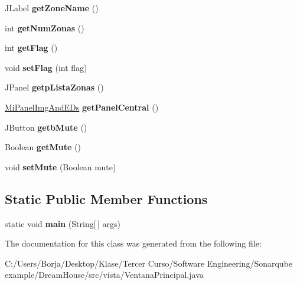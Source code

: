 \begin{DoxyCompactItemize}
\item 
\mbox{\label{classvista_1_1_ventana_principal_a1534a5187e8ce83f76c44abc02cb2236}} 
J\+Label {\bfseries get\+Zone\+Name} ()
\item 
\mbox{\label{classvista_1_1_ventana_principal_a7303665d4193ebf7c4693846114fb96d}} 
int {\bfseries get\+Num\+Zonas} ()
\item 
\mbox{\label{classvista_1_1_ventana_principal_a740a2cfb769129790ed6026fba51988b}} 
int {\bfseries get\+Flag} ()
\item 
\mbox{\label{classvista_1_1_ventana_principal_a355d4483232fb23eb4b2e1c27c7086a9}} 
void {\bfseries set\+Flag} (int flag)
\item 
\mbox{\label{classvista_1_1_ventana_principal_a95bbd92b1f1d270c58f62c6004efa0f3}} 
J\+Panel {\bfseries getp\+Lista\+Zonas} ()
\item 
\mbox{\label{classvista_1_1_ventana_principal_a34c5b655d700623d5a936f252211f80e}} 
\mbox{\hyperlink{classvista_1_1_mi_panel_img_and_e_ds}{Mi\+Panel\+Img\+And\+E\+Ds}} {\bfseries get\+Panel\+Central} ()
\item 
\mbox{\label{classvista_1_1_ventana_principal_aee94264e918d71a71fb001bb26aaa3dc}} 
J\+Button {\bfseries getb\+Mute} ()
\item 
\mbox{\label{classvista_1_1_ventana_principal_a908035b3b52dfaf391f1f6453ecb9565}} 
Boolean {\bfseries get\+Mute} ()
\item 
\mbox{\label{classvista_1_1_ventana_principal_a22637ae07a73f26d3f975a9d46d1acea}} 
void {\bfseries set\+Mute} (Boolean mute)
\end{DoxyCompactItemize}
\subsection*{Static Public Member Functions}
\begin{DoxyCompactItemize}
\item 
\mbox{\label{classvista_1_1_ventana_principal_ae492857ab0e8a1bdc5161177cb1d127e}} 
static void {\bfseries main} (String\mbox{[}$\,$\mbox{]} args)
\end{DoxyCompactItemize}


The documentation for this class was generated from the following file\+:\begin{DoxyCompactItemize}
\item 
C\+:/\+Users/\+Borja/\+Desktop/\+Klase/\+Tercer Curso/\+Software Engineering/\+Sonarqube example/\+Dream\+House/src/vista/Ventana\+Principal.\+java\end{DoxyCompactItemize}
